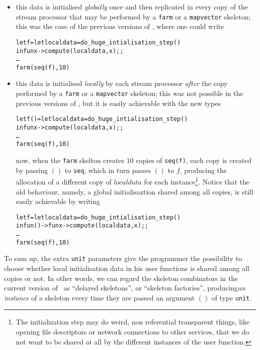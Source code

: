 \begin{itemize}
  \item this data is initialised \emph{globally} once and then replicated in every copy of the stream processor that
        may be performed by a \verb|farm| or a \verb|mapvector| skeleton; this was the case of
	the previous versions of \ocamlpiiil, where one could write
\begin{alltt}
let f = let localdata = do_huge_intialisation_step ()
        in fun x -> compute (localdata,x);;
\ldots{}
farm(seq(f),10)
\end{alltt}
%
  \item this data is initialised \emph{locally} by each stream processor \emph{after} the
        copy performed by a \verb|farm| or a \verb|mapvector| skeleton; this was not possible
        in the previous versions of \ocamlpiiil, but it is easily achievable with the new types
%
\begin{alltt}
let f () = let localdata = do_huge_intialisation_step ()
           in fun x -> compute (localdata,x);;
\ldots{}
farm(seq(f),10)
\end{alltt}
%
        now, when the \verb|farm| skelton creates $10$ copies of \verb|seq(f)|, each copy is
        created by passing $()$ to \verb|seq|, which in turn passes $()$ to $f$, producing
        the allocation of a different copy of $localdata$ for each instance\footnote{The initialization step may do weird, non referential transparent things, like opening file descriptors or network connections to other services, that we
do not want to be shared at all by the different instances of the user function.}.
        Notice that the old behaviour, namely, a global initialisaztion shared among all copies, is
        still easily achievable by writing
%
\begin{alltt}
let f = let localdata = do_huge_intialisation_step ()
        in fun () -> fun x -> compute (localdata,x);;
\ldots{}
farm(seq(f),10)
\end{alltt}
%
\end{itemize}

To sum up, the extra \verb|unit| parameters give the programmer the possibility to choose whether local
initialisation data in his user functions is shared among all copies or not. In other words, we can regard
the skeleton combinators in the current version of \ocamlpiiil\ as ``delayed skeletons'', or ``skeleton factories'',
producing\emph{an instance} of a skeleton every time they are passed an argument $()$ of type \verb|unit|.

